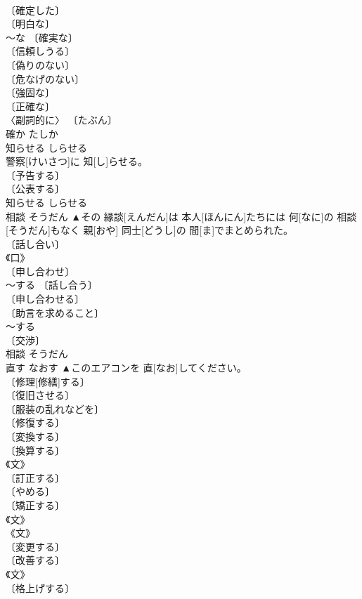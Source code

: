 \documentclass[8pt]{extreport}
\begin{document}
\begin{CJK}{UTF8}{min}
\\	〔確定した〕 
\\	〔明白な〕 
\\	～な 〔確実な〕 
\\	〔信頼しうる〕 
\\	〔偽りのない〕 
\\	〔危なげのない〕 
\\	〔強固な〕 
\\	〔正確な〕 
\\	〈副詞的に〉 〔たぶん〕 
\\	確か	たしか	
\\	知らせる	しらせる	
\\	警察[けいさつ]に 知[し]らせる。	
\\	〔予告する〕 
\\	〔公表する〕 
\\	知らせる	しらせる	
\\	相談	そうだん	▲その 縁談[えんだん]は 本人[ほんにん]たちには 何[なに]の 相談[そうだん]もなく 親[おや] 同士[どうし]の 間[ま]でまとめられた。	
\\	〔話し合い〕 
\\	《口》 
\\	〔申し合わせ〕 
\\	～する 〔話し合う〕 
\\	〔申し合わせる〕 
\\	〔助言を求めること〕 
\\	～する 
\\	〔交渉〕 
\\	相談	そうだん	
\\	直す	なおす	▲このエアコンを 直[なお]してください。	
\\	〔修理[修繕]する〕 
\\	〔復旧させる〕 
\\	〔服装の乱れなどを〕 
\\	〔修復する〕 
\\	〔変換する〕 
\\	〔換算する〕 
\\	《文》 
\\	〔訂正する〕 
\\	〔やめる〕 
\\	〔矯正する〕 
\\	《文》 
\\	《文》 
\\	〔変更する〕 
\\	〔改善する〕 
\\	《文》 
\\	〔格上げする〕 

\end{CJK}
\end{document}
